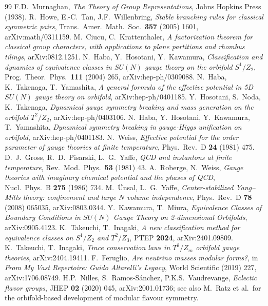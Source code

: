 \documentclass[11pt,a4paper]{article}
\begin{document}
\begin{thebibliography}{99}
 F.D.~Murnaghan, \emph{The Theory of Group Representations}, Johns
Hopkins Press (1938).
 R.~Howe, E.-C.~Tan, J.F.~Willenbring, \emph{Stable branching
rules for classical symmetric pairs}, Trans.\ Amer.\ Math.\ Soc.\ \textbf{357} (2005) 1601,
arXiv:math/0311159.
 M.~Ciucu, C.~Krattenthaler, \emph{A factorization theorem for
classical group characters, with applications to plane partitions and rhombus tilings},
arXiv:0812.1251.
 N.~Haba, Y.~Hosotani, Y.~Kawamura, \emph{Classification and dynamics of
equivalence classes in $SU(N)$ gauge theory on the orbifold $S^1/Z_2$}, Prog.\ Theor.\ Phys.\
\textbf{111} (2004) 265, arXiv:hep-ph/0309088.
 N.~Haba, K.~Takenaga, T.~Yamashita, \emph{A general formula of the effective
potential in 5D $SU(N)$ gauge theory on orbifold}, arXiv:hep-ph/0401185.
\bibitem{HNT} Y.~Hosotani, S.~Noda, K.~Takenaga, \emph{Dynamical gauge symmetry breaking and
mass generation on the orbifold $T^2/Z_2$}, arXiv:hep-ph/0403106.
\bibitem{HHKY} N.~Haba, Y.~Hosotani, Y.~Kawamura, T.~Yamashita, \emph{Dynamical symmetry
breaking in gauge-Higgs unification on orbifold}, arXiv:hep-ph/0401183.
\bibitem{Weiss} N.~Weiss, \emph{Effective potential for the order parameter of gauge theories
at finite temperature}, Phys.\ Rev.\ D \textbf{24} (1981) 475.
 D.~J.~Gross, R.~D.~Pisarski, L.~G.~Yaffe, \emph{QCD and instantons at finite
temperature}, Rev.\ Mod.\ Phys.\ \textbf{53} (1981) 43.
 A.~Roberge, N.~Weiss, \emph{Gauge theories with imaginary chemical
potential and the phases of QCD}, Nucl.\ Phys.\ B \textbf{275} (1986) 734.
\bibitem{UnsalYaffe} M.~\"Unsal, L.~G.~Yaffe, \emph{Center-stabilized Yang--Mills theory:
confinement and large $N$ volume independence}, Phys.\ Rev.\ D \textbf{78} (2008) 065035,
arXiv:0803.0344.
 Y.~Kawamura, T.~Miura, \emph{Equivalence Classes of Boundary
Conditions in $SU(N)$ Gauge Theory on 2-dimensional Orbifolds}, arXiv:0905.4123.
\bibitem{Takeuchi1} K.~Takeuchi, T.~Inagaki, \emph{A new classification method for
equivalence classes on $S^1/Z_2$ and $T^2/Z_3$}, PTEP \textbf{2024}, arXiv:2401.09809.
\bibitem{Takeuchi2} K.~Takeuchi, T.~Inagaki, \emph{Trace conservation laws in $T^2/Z_m$
orbifold gauge theories}, arXiv:2404.19411.
 F.~Feruglio, \emph{Are neutrino masses modular forms?}, in
\emph{From My Vast Repertoire: Guido Altarelli's Legacy}, World Scientific (2019) 227,
arXiv:1706.08749.
 H.P.~Nilles, S.~Ramos-S\'anchez, P.K.S.~Vaudrevange, \emph{Eclectic
flavor groups}, JHEP \textbf{02} (2020) 045, arXiv:2001.01736; see also M.~Ratz et al.\ for
the orbifold-based development of modular flavour symmetry.
\end{thebibliography}
\end{document}
